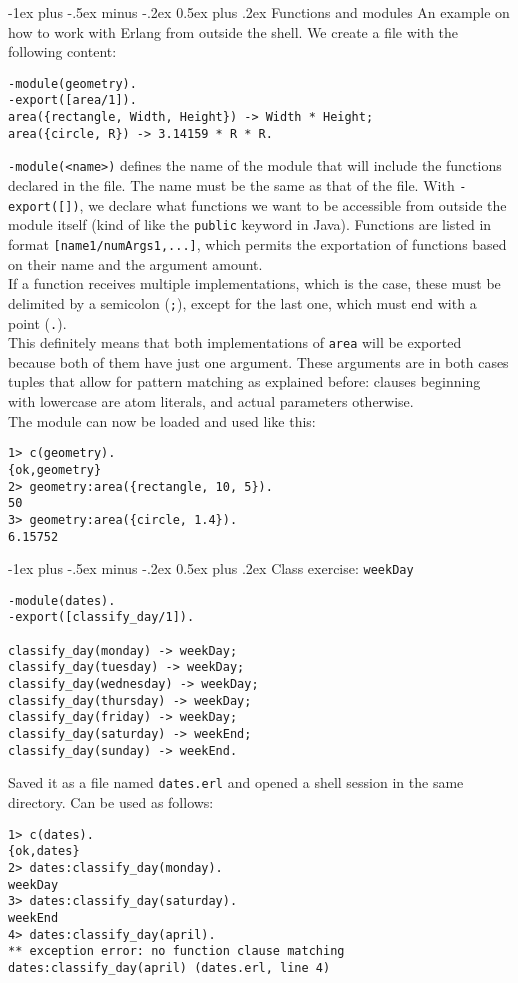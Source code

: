 \documentclass[10pt,landscape]{article}
\makeatletter
\renewcommand{\section}{\@startsection{section}{1}{0mm}%
                                {-1ex plus -.5ex minus -.2ex}%
                                {0.5ex plus .2ex}%
                                {\normalfont\large\bfseries}}
\makeatother
\begin{document}
\begin{multicols}{3}
\section{Functions and modules}
An example on how to work with Erlang from outside the shell. We create a file with the following content:
\begin{verbatim}
-module(geometry).
-export([area/1]).
area({rectangle, Width, Height}) -> Width * Height;
area({circle, R}) -> 3.14159 * R * R.
\end{verbatim}
\texttt{-module(<name>)} defines the name of the module that will include the functions declared in the file. The name must be the same as that of the file. With \texttt{-export([])}, we declare what functions we want to be accessible from outside the module itself (kind of like the \texttt{public} keyword in Java). Functions are listed in format \texttt{[name1/numArgs1,...]}, which permits the exportation of functions based on their name and the argument amount. \\
If a function receives multiple implementations, which is the case, these must be delimited by a semicolon (\texttt{;}), except for the last one, which must end with a point (\texttt{.}). \\
This definitely means that both implementations of \texttt{area} will be exported because both of them have just one argument. These arguments are in both cases tuples that allow for pattern matching as explained before: clauses beginning with lowercase are atom literals, and actual parameters otherwise. \\
The module can now be loaded and used like this:
\begin{verbatim}
1> c(geometry).
{ok,geometry}
2> geometry:area({rectangle, 10, 5}).
50
3> geometry:area({circle, 1.4}).
6.15752
\end{verbatim}
\section{Class exercise: \texttt{weekDay}}
\begin{verbatim}
-module(dates).
-export([classify_day/1]).

classify_day(monday) -> weekDay;
classify_day(tuesday) -> weekDay;
classify_day(wednesday) -> weekDay;
classify_day(thursday) -> weekDay;
classify_day(friday) -> weekDay;
classify_day(saturday) -> weekEnd;
classify_day(sunday) -> weekEnd.
\end{verbatim}
Saved it as a file named \texttt{dates.erl} and opened a shell session in the same directory. Can be used as follows:
\begin{verbatim}
1> c(dates).
{ok,dates}
2> dates:classify_day(monday).
weekDay
3> dates:classify_day(saturday).
weekEnd
4> dates:classify_day(april).   
** exception error: no function clause matching dates:classify_day(april) (dates.erl, line 4)
\end{verbatim}

\end{multicols}
\end{document}
